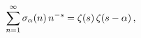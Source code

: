 \[\sum_{n=1}^{\infty}\mathop{\sigma_{\alpha}\/}\nolimits\!\left(n\right)n^{-s}=%
\mathop{\zeta\/}\nolimits\!\left(s\right)\mathop{\zeta\/}\nolimits\!\left(s-%
\alpha\right),\]
